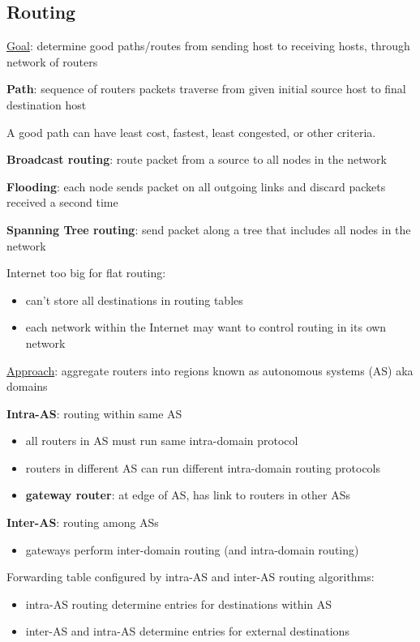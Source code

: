 \documentclass[11pt]{article}
\begin{document}
\subsection{Routing}
\label{sec:orgf7e7624}
\uline{Goal}: determine good paths/routes from sending host to receiving hosts, through network of
routers

\textbf{Path}: sequence of routers packets traverse from given initial source host to final destination
host

A good path can have least cost, fastest, least congested, or other criteria.

\textbf{Broadcast routing}: route packet from a source to all nodes in the network

\textbf{Flooding}: each node sends packet on all outgoing links and discard packets received a second time

\textbf{Spanning Tree routing}: send packet along a tree that includes all nodes in the network

Internet too big for flat routing:
\begin{itemize}
\item can't store all destinations in routing tables
\item each network within the Internet may want to control routing in its own network
\end{itemize}

\uline{Approach}: aggregate routers into regions known as autonomous systems (AS) aka domains

\textbf{Intra-AS}: routing within same AS
\begin{itemize}
\item all routers in AS must run same intra-domain protocol
\item routers in different AS can run different intra-domain routing protocols
\item \textbf{gateway router}: at edge of AS, has link to routers in other ASs
\end{itemize}

\textbf{Inter-AS}: routing among ASs
\begin{itemize}
\item gateways perform inter-domain routing (and intra-domain routing)
\end{itemize}

Forwarding table configured by intra-AS and inter-AS routing algorithms:
\begin{itemize}
\item intra-AS routing determine entries for destinations within AS
\item inter-AS and intra-AS determine entries for external destinations
\end{itemize}
\end{document}
